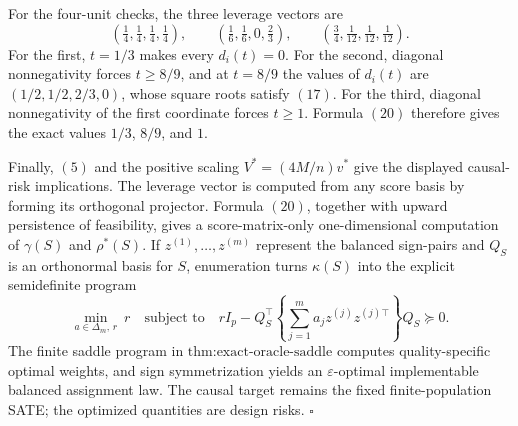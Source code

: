 For the four-unit checks, the three leverage vectors are
\[
\left(\tfrac14,\tfrac14,\tfrac14,\tfrac14\right),
\qquad
\left(\tfrac16,\tfrac16,0,\tfrac23\right),
\qquad
\left(\tfrac34,\tfrac1{12},\tfrac1{12},\tfrac1{12}\right).
\tag{23}
\]
For the first, \(t=1/3\) makes every \(d_i(t)=0\).  For the second, diagonal nonnegativity forces \(t\geq8/9\), and at \(t=8/9\) the values of \(d_i(t)\) are \((1/2,1/2,2/3,0)\), whose square roots satisfy \((17)\).  For the third, diagonal nonnegativity of the first coordinate forces \(t\geq1\).  Formula \((20)\) therefore gives the exact values \(1/3\), \(8/9\), and \(1\).

Finally, \((5)\) and the positive scaling \(V^*=(4M/n)v^*\) give the displayed causal-risk implications.  The leverage vector is computed from any score basis by forming its orthogonal projector.  Formula \((20)\), together with upward persistence of feasibility, gives a score-matrix-only one-dimensional computation of \(\gamma(S)\) and \(\rho^*(S)\).  If \(z^{(1)},\ldots,z^{(m)}\) represent the balanced sign-pairs and \(Q_S\) is an orthonormal basis for \(S\), enumeration turns \(\kappa(S)\) into the explicit semidefinite program
\[
\min_{a\in\Delta_m,\,r}\ r
\quad\text{subject to}\quad
rI_p-Q_S^\top\left\{\sum_{j=1}^m a_jz^{(j)}z^{(j)\top}\right\}Q_S\succeq0.
\tag{24}
\]
The finite saddle program in \(\text{thm:exact-oracle-saddle}\) computes quality-specific optimal weights, and sign symmetrization yields an \(\varepsilon\)-optimal implementable balanced assignment law.  The causal target remains the fixed finite-population SATE; the optimized quantities are design risks. \(\square\)
